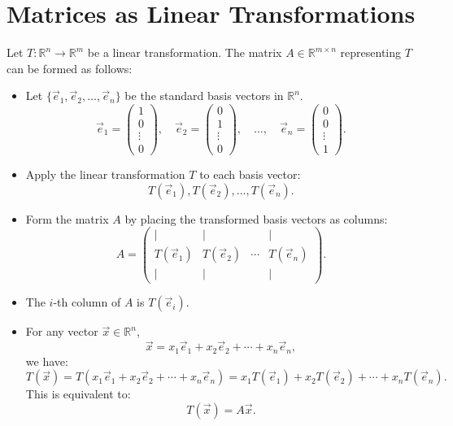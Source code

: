 \documentclass[12pt]{article}
\begin{document}
\section{Matrices as Linear Transformations}

Let \( T: \mathbb{R}^n \to \mathbb{R}^m \) be a linear transformation. The matrix \( A \in \mathbb{R}^{m \times n} \) representing \( T \) can be formed as follows:

\begin{itemize}
    \item Let \( \{ \vec{e}_1, \vec{e}_2, \ldots, \vec{e}_n \} \) be the standard basis vectors in \(\mathbb{R}^n\).
    \[
    \vec{e}_1 = \begin{pmatrix} 1 \\ 0 \\ \vdots \\ 0 \end{pmatrix}, \quad
    \vec{e}_2 = \begin{pmatrix} 0 \\ 1 \\ \vdots \\ 0 \end{pmatrix}, \quad \ldots, \quad
    \vec{e}_n = \begin{pmatrix} 0 \\ 0 \\ \vdots \\ 1 \end{pmatrix}.
    \]

    \item Apply the linear transformation \( T \) to each basis vector:
    \[
    T(\vec{e}_1), T(\vec{e}_2), \ldots, T(\vec{e}_n).
    \]

    \item Form the matrix \( A \) by placing the transformed basis vectors as columns:
    \[
    A = \begin{pmatrix} | & | & & | \\
    T(\vec{e}_1) & T(\vec{e}_2) & \cdots & T(\vec{e}_n) \\
    | & | & & | \end{pmatrix}.
    \]

    \item The \( i \)-th column of \( A \) is \( T(\vec{e}_i) \).

    \item For any vector \(\vec{x} \in \mathbb{R}^n\),
    \[
    \vec{x} = x_1 \vec{e}_1 + x_2 \vec{e}_2 + \cdots + x_n \vec{e}_n,
    \]
    we have:
    \[
    T(\vec{x}) = T(x_1 \vec{e}_1 + x_2 \vec{e}_2 + \cdots + x_n \vec{e}_n) = x_1 T(\vec{e}_1) + x_2 T(\vec{e}_2) + \cdots + x_n T(\vec{e}_n).
    \]
    This is equivalent to:
    \[
    T(\vec{x}) = A \vec{x}.
    \]
\end{itemize}
\end{document}
